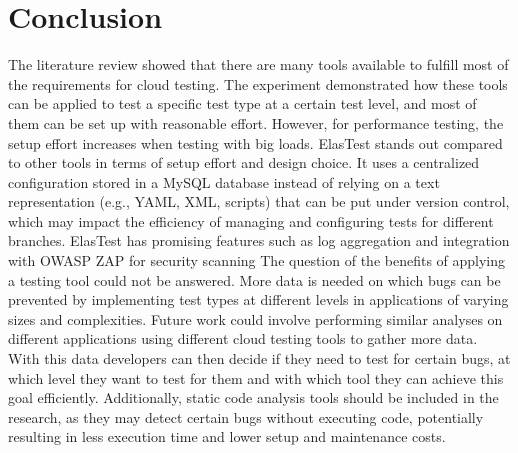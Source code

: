\documentclass[conference]{IEEEtran}
\begin{document}
\section{Conclusion}

The literature review showed that there are many tools available to fulfill most of the requirements for cloud testing.
The experiment demonstrated how these tools can be applied to test a specific test type at a certain test level,
and most of them can be set up with reasonable effort.
However, for performance testing, the setup effort increases when testing with big loads.
ElasTest stands out compared to other tools in terms of setup effort and design choice.
It uses a centralized configuration stored in a MySQL database instead of relying on a text representation (e.g., YAML, XML, scripts)
that can be put under version control, which may impact the efficiency of managing and configuring tests for different branches.
ElasTest has promising features such as log aggregation and integration with OWASP ZAP for security scanning
The question of the benefits of applying a testing tool could not be answered.
More data is needed on which bugs can be prevented by implementing test types at different levels in applications of varying sizes and complexities.
Future work could involve performing similar analyses on different applications using different cloud testing tools to gather more data.
With this data developers can then decide if they need to test for certain bugs, at which level they want to test
for them and with which tool they can achieve this goal efficiently.
Additionally, static code analysis tools should be included in the research, as they may detect certain bugs without executing code,
potentially resulting in less execution time and lower setup and maintenance costs.




\date{\today}



\newpage
%
\end{document}
